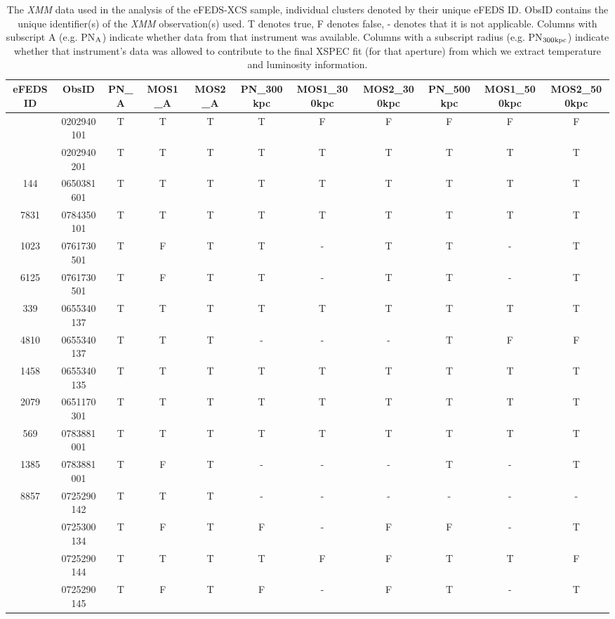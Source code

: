 \documentclass[fleqn,usenatbib]{mnras}
\begin{document}
\begin{table}
\begin{center}
\caption{{The {\em XMM} data used in the analysis of the eFEDS-XCS sample, individual clusters denoted by their unique eFEDS ID. ObsID contains the unique identifier(s) of the {\em XMM} observation(s) used. T denotes true, F denotes false, - denotes that it is not applicable. Columns with subscript A (e.g. PN$_{\rm{A}}$) indicate whether data from that instrument was available. Columns with a subscript radius (e.g. PN$_{\rm{300kpc}}$) indicate whether that instrument's data was allowed to contribute to the final XSPEC fit (for that aperture) from which we extract temperature and luminosity information.}\label{tab:xmmobs}}
\vspace{1mm}
\begin{tabular}{ccccccccccc}
\hline
\hline
eFEDS ID & ObsID & PN_\rm{A} & MOS1_\rm{A} & MOS2_\rm{A} & PN_\rm{300kpc} & MOS1_\rm{300kpc} & MOS2_\rm{300kpc} & PN_\rm{500kpc} & MOS1_\rm{500kpc} & MOS2_\rm{500kpc}\\
\hline
\hline
\multirow{2}{4em}{\centering 6605} & 0202940101 & T & T & T & T & F & F & F & F & F \\ & 0202940201 & T & T & T & T & T & T & T & T & T \\ 
\hline
144 & 0650381601 & T & T & T & T & T & T & T & T & T \\ 
\hline
7831 & 0784350101 & T & T & T & T & T & T & T & T & T \\ 
\hline
1023 & 0761730501 & T & F & T & T & - & T & T & - & T \\ 
\hline
6125 & 0761730501 & T & F & T & T & - & T & T & - & T \\ 
\hline
339 & 0655340137 & T & T & T & T & T & T & T & T & T \\ 
\hline
4810 & 0655340137 & T & T & T & - & - & - & T & F & F \\ 
\hline
1458 & 0655340135 & T & T & T & T & T & T & T & T & T \\ 
\hline
2079 & 0651170301 & T & T & T & T & T & T & T & T & T \\ 
\hline
569 & 0783881001 & T & T & T & T & T & T & T & T & T \\ 
\hline
1385 & 0783881001 & T & F & T & - & - & - & T & - & T \\ 
\hline
8857 & 0725290142 & T & T & T & - & - & - & - & - & - \\ 
\hline
\multirow{3}{4em}{\centering 3171} & 0725300134 & T & F & T & F & - & F & F & - & T \\ & 0725290144 & T & T & T & T & F & F & T & T & F \\ & 0725290145 & T & F & T & F & - & F & T & - & T \\ 

\end{tabular}
\end{center}
\end{table}
\end{document}
